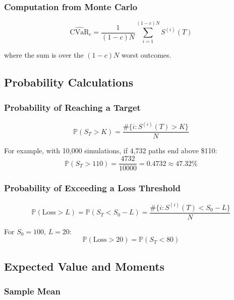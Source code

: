 \documentclass[12pt,a4paper]{article}
\begin{document}
\subsubsection{Computation from Monte Carlo}

\begin{equation}
\widehat{\text{CVaR}}_c = \frac{1}{(1-c)N} \sum_{i=1}^{(1-c)N} S^{(i)}(T)
\end{equation}

where the sum is over the $(1-c)N$ worst outcomes.

\subsection{Probability Calculations}

\subsubsection{Probability of Reaching a Target}

\begin{equation}
\mathbb{P}(S_T > K) = \frac{\#\{i : S^{(i)}(T) > K\}}{N}
\end{equation}

For example, with 10,000 simulations, if 4,732 paths end above \$110:
\begin{equation}
\mathbb{P}(S_T > 110) = \frac{4732}{10000} = 0.4732 \approx 47.32\%
\end{equation}

\subsubsection{Probability of Exceeding a Loss Threshold}

\begin{equation}
\mathbb{P}(\text{Loss} > L) = \mathbb{P}(S_T < S_0 - L) = \frac{\#\{i : S^{(i)}(T) < S_0 - L\}}{N}
\end{equation}

For $S_0 = 100$, $L = 20$:
\begin{equation}
\mathbb{P}(\text{Loss} > 20) = \mathbb{P}(S_T < 80)
\end{equation}

\subsection{Expected Value and Moments}

\subsubsection{Sample Mean}
\end{document}
